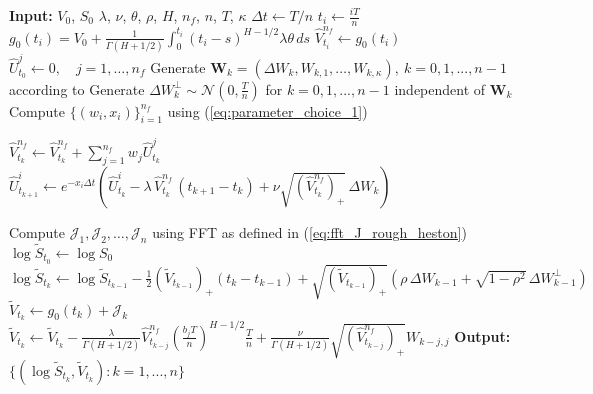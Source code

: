 \documentclass[11pt]{article}%
\theoremstyle{definition}
\begin{document}
\begin{algorithm}[bph]
    \caption{Simulation of rough Heston model (\ref{eq:price-process})-(\ref{eq:variance-process}) using Accelerated Hybrid Scheme}
    \label{alg:simulation_rough_heston}
    \begin{algorithmic}[1]
        \STATE \textbf{Input:} \(V_0\), \(S_0\) \(\lambda\), \(\nu\), \(\theta\), \(\rho\), \(H\), \(n_f\), \(n\), \(T\), \(\kappa\)
        \STATE \(\Delta t \gets T/n\)
            \STATE \(t_i \gets \tfrac{iT}{n}\)
            \STATE \(g_0(t_i) = V_0 + \frac{1}{\Gamma(H+1/2)} \int_{0}^{t_i} (t_i-s)^{H-1/2} \lambda \theta \, ds\)
            \STATE \(\widehat{V}_{t_i}^{n_f} \gets g_0(t_i)\)
        \ENDFOR
        \STATE \(\widehat{U}_{t_0}^j \gets 0,\quad j=1,\ldots,n_f\) 
        \STATE Generate \(\mathbf{W}_k = (\Delta W_k, W_{k,1},\ldots,W_{k,\kappa}),\ k=0,1,...,n-1\) according to \cite{bennedsen_2017_FS}
        \STATE Generate \(\Delta W_k^\perp \sim \mathcal{N}(0,\tfrac{T}{n})\) for \(k=0,1,...,n-1\) independent of \(\mathbf{W}_k\)
        \STATE Compute \(\{(w_i,x_i)\}_{i=1}^{n_f}\) using (\ref{eq:parameter_choice_1})

            \STATE \(\widehat{V}_{t_k}^{n_f} \gets \widehat{V}_{t_k}^{n_f} + \sum_{j=1}^{n_f} w_j \widehat{U}_{t_k}^j\)
                \STATE \(\widehat{U}_{t_{k+1}}^i \gets e^{-x_i\Delta t} \left(
                    \widehat{U}_{t_k}^{i} - \lambda\, \widehat{V}_{t_k}^{n_f}\,(t_{k+1}-t_k) + \nu \sqrt{(\widehat{V}_{t_k}^{n_f})_+}\,\Delta W_k
                \right)
                \)
            \ENDFOR
        \ENDFOR

        \STATE Compute \(\mathcal{J}_1,\mathcal{J}_2,\ldots,\mathcal{J}_n\) using FFT as defined in (\ref{eq:fft_J_rough_heston})
        \STATE \(\log \widetilde{S}_{t_0} \gets \log S_0\)
            \STATE \( \log \widetilde{S}_{t_{k}} \gets \log \widetilde{S}_{t_{k-1}} -\frac{1}{2} (\widetilde{V}_{t_{k-1}})_{+} (t_k-t_{k-1}) + \sqrt{(\widetilde{V}_{t_{k-1}})_{+}}(\rho \,\Delta W_{k-1} + \sqrt{1-\rho^2}\,\Delta W_{k-1}^\perp) \)
            \STATE \(\widetilde{V}_{t_k} \gets g_0(t_k) + \mathcal{J}_k\)
                    \STATE \(\widetilde{V}_{t_k} \gets \widetilde{V}_{t_k} - \tfrac{\lambda}{\Gamma(H+1/2)} \widehat{V}_{t_{k-j}}^{n_f} \left(\frac{b_j T}{n}\right)^{H-1/2} \frac{T}{n} + \tfrac{\nu}{\Gamma(H+1/2)} \sqrt{(\widehat{V}_{t_{k-j}}^{n_f})_+} W_{k-j,j}\)
                \ENDIF
            \ENDFOR
        \ENDFOR
        \STATE \textbf{Output:} \(\{(\log \widetilde{S}_{t_k}, \widetilde{V}_{t_k}): k=1,...,n\}\)
    \end{algorithmic}
\end{algorithm}
\end{document}
